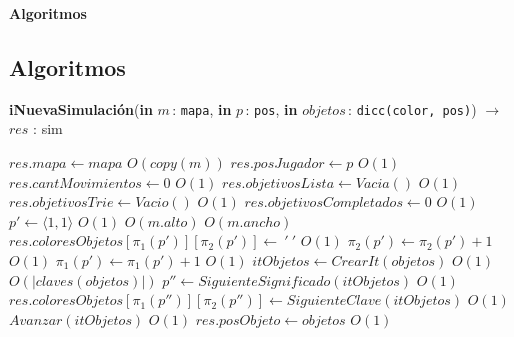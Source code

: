 \documentclass[a4paper,10pt]{article}
\let\TipoVariable=\texttt
\let\ModificadorArgumento=\textbf
\newcommand{\In}[2]{\ModificadorArgumento{in} \ensuremath{#1}\,: \TipoVariable{#2}\xspace}
\newenvironment{Algoritmos}{%
  \vspace*{2ex}%
  \noindent\textbf{\Large Algoritmos}%
  \vspace*{2ex}%
}{}
\begin{document}
\begin{Algoritmos}
  
\subsection{Algoritmos}  
  
\begin{algorithm}[H]{\textbf{iNuevaSimulación}(\In{m}{mapa}, \In{p}{pos}, \In{objetos}{dicc(color, pos)}) $\to$ $res$ : sim}
      \begin{algorithmic}[1]
        \State $res.mapa \gets mapa$                                                                    \Comment $O(copy(m))$
        \State $res.posJugador \gets p$                                                                 \Comment $O(1)$
        \State $res.cantMovimientos \gets 0$                                                            \Comment $O(1)$
        \State $res.objetivosLista \gets Vacia()$                                                       \Comment $O(1)$
        \State $res.objetivosTrie \gets Vacio()$                                                        \Comment $O(1)$
        \State $res.objetivosCompletados \gets 0$                                                       \Comment $O(1)$
        \State $p' \gets \langle 1, 1 \rangle$                                                          \Comment $O(1)$
                                                                       \Comment $O(m.alto)$
                                                                      \Comment $O(m.ancho)$
                \State $res.coloresObjetos [\pi_{1}(p')][\pi_{2}(p')] \gets \ ' \ '$                    \Comment $O(1)$
                \State $\pi_{2}(p') \gets \pi_{2}(p') + 1$                                              \Comment $O(1)$
            \EndWhile
            \State $\pi_{1}(p') \gets \pi_{1}(p') + 1$                                                  \Comment $O(1)$
        \EndWhile
        \State $itObjetos \gets CrearIt(objetos)$                                                       \Comment $O(1)$
                                                                       \Comment $O(|claves(objetos)|)$
            \State $p'' \gets SiguienteSignificado(itObjetos) $                                         \Comment $O(1)$
            \State $res.coloresObjetos [\pi_{1}(p'')][\pi_{2}(p'')] \gets SiguienteClave(itObjetos) $   \Comment $O(1)$
            \State $Avanzar(itObjetos)$                                                                 \Comment $O(1)$
        \EndWhile
        \State $res.posObjeto \gets objetos$                                                            \Comment $O(1)$
       

\end{algorithmic}
\end{algorithm}
\end{Algoritmos}
\end{document}

